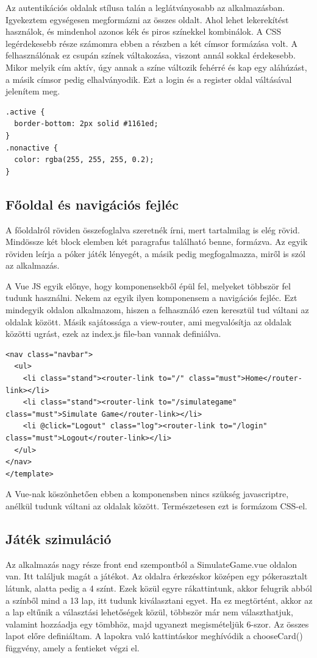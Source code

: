 Az autentikációs oldalak stílusa talán a leglátványosabb az alkalmazásban. Igyekeztem egységesen megformázni az összes oldalt. Ahol lehet lekerekítést használok, és mindenhol azonos kék és piros színekkel kombinálok. A CSS legérdekesebb része számomra ebben a részben a két címsor formázása volt. A felhasználónak ez csupán színek váltakozása, viszont annál sokkal érdekesebb. Mikor melyik cím aktív, úgy annak a színe változik fehérré és kap egy aláhúzást, a másik címsor pedig elhalványodik. Ezt a login és a register oldal váltásával jelenítem meg.

\begin{lstlisting}[style=htmlcssjs]
.active {
  border-bottom: 2px solid #1161ed;
}
.nonactive {
  color: rgba(255, 255, 255, 0.2);
}
\end{lstlisting}

\subsection{Főoldal és navigációs fejléc}
A főoldalról röviden összefoglalva szeretnék írni, mert tartalmilag is elég rövid. Mindössze két block elemben két paragrafus található benne, formázva. Az egyik röviden leírja a póker játék lényegét, a másik pedig megfogalmazza, miről is szól az alkalmazás.

A Vue JS egyik előnye, hogy komponensekből épül fel, melyeket többször fel tudunk használni. Nekem az egyik ilyen komponensem a navigációs fejléc. Ezt mindegyik oldalon alkalmazom, hiszen a felhasználó ezen keresztül tud váltani az oldalak között. Másik sajátossága a view-router, ami megvalósítja az oldalak közötti ugrást, ezek az index.js file-ban vannak definiálva.

\begin{lstlisting}[style=htmlcssjs]
<nav class="navbar">
  <ul>
    <li class="stand"><router-link to="/" class="must">Home</router-link></li>
    <li class="stand"><router-link to="/simulategame" class="must">Simulate Game</router-link></li>
    <li @click="Logout" class="log"><router-link to="/login" class="must">Logout</router-link></li>
  </ul>
</nav>
</template>
\end{lstlisting}

A Vue-nak köszönhetően ebben a komponensben nincs szükség javascriptre, anélkül tudunk váltani az oldalak között. Természetesen ezt is formázom CSS-el.

\subsection{Játék szimuláció}
Az alkalmazás nagy része front end szempontból a SimulateGame.vue oldalon van. Itt találjuk magát a játékot. Az oldalra érkezéskor középen egy pókerasztalt látunk, alatta pedig a 4 színt. Ezek közül egyre rákattintunk, akkor felugrik abból a színből mind a 13 lap, itt tudunk kiválasztani egyet. Ha ez megtörtént, akkor az a lap eltűnik a választási lehetőségek közül, többször már nem választhatjuk, valamint hozzáadja egy tömbhöz, majd ugyanezt megismételjük 6-szor. Az összes lapot előre definiáltam. A lapokra való kattintáskor meghívódik a chooseCard() függvény, amely a fentieket végzi el.

